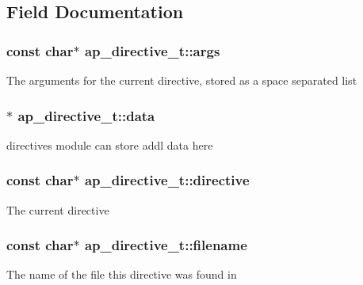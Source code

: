 \subsection{Field Documentation}
\subsubsection[{\texorpdfstring{args}{args}}]{\setlength{\rightskip}{0pt plus 5cm}const char$\ast$ ap\+\_\+directive\+\_\+t\+::args}\hypertarget{structap__directive__t_ad15c07ad28925cabd3103b6ad3fe0a6f}{}\label{structap__directive__t_ad15c07ad28925cabd3103b6ad3fe0a6f}
The arguments for the current directive, stored as a space separated list 
\subsubsection[{\texorpdfstring{data}{data}}]{$\ast$ ap\+\_\+directive\+\_\+t\+::data}\hypertarget{structap__directive__t_a058fec74505034b91db4688d3eb544e6}{}\label{structap__directive__t_a058fec74505034b91db4688d3eb544e6}
directive\textquotesingle{}s module can store add\textquotesingle{}l data here 
\subsubsection[{\texorpdfstring{directive}{directive}}]{\setlength{\rightskip}{0pt plus 5cm}const char$\ast$ ap\+\_\+directive\+\_\+t\+::directive}\hypertarget{structap__directive__t_ae34ef98c8ee07242d69e20f54a6fbdae}{}\label{structap__directive__t_ae34ef98c8ee07242d69e20f54a6fbdae}
The current directive 
\subsubsection[{\texorpdfstring{filename}{filename}}]{\setlength{\rightskip}{0pt plus 5cm}const char$\ast$ ap\+\_\+directive\+\_\+t\+::filename}\hypertarget{structap__directive__t_a39d11e553a29d211382db34ba04609ee}{}\label{structap__directive__t_a39d11e553a29d211382db34ba04609ee}
The name of the file this directive was found in 
